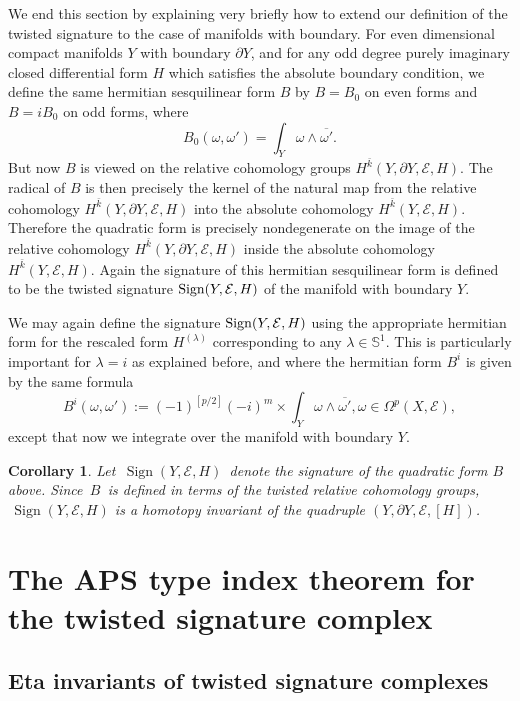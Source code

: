 \documentclass[12pt]{amsart}
\theoremstyle{plain}
\newtheorem{corollary}[theorem]{Corollary}
\theoremstyle{definition}
\theoremstyle{remark}
\begin{document}
We end this section by explaining very briefly how to extend our definition of the twisted signature to the case of manifolds with boundary. 
For even dimensional compact manifolds  $Y$ with boundary $\partial Y$, and for any odd degree purely imaginary closed differential form $H$ which satisfies the absolute boundary condition, 
we define the same hermitian sesquilinear form $B$ by $B= B_0$ on even forms and $B=iB_0$ on odd forms, where 
$$
B_0 (\omega, \omega' ) = \int_Y \omega \wedge {\overline{\omega'}}.
$$
But now $B$ is viewed on the relative cohomology 
groups $H^{\bar k}(Y, \partial Y, {\mathcal E},H)$. The radical of $B$ is then precisely the 
kernel of the natural map from the relative cohomology  $H^{\bar k}(Y, \partial Y, {\mathcal E},H)$ into 
the absolute cohomology $H^{\bar k}(Y,  {\mathcal E},H)$. Therefore the
quadratic form is precisely nondegenerate on the 
image of the relative cohomology  $H^{\bar k}(Y, \partial Y, {\mathcal E},H)$ inside the absolute cohomology 
$H^{\bar k}(Y,  {\mathcal E},H)$. Again the signature of this hermitian sesquilinear form 
is defined to be the twisted signature ${\rm Sign}(Y, {\mathcal E}, H)$ of the manifold with boundary $Y$.

We may again  define the signature ${\rm Sign}(Y, {\mathcal E}, H)$ using the appropriate hermitian form for the rescaled form $H^{(\lambda)}$ corresponding to 
any $\lambda\in {\mathbb{S}}^1$. This is particularly important for $\lambda = i$ as explained before, and where the hermitian form $B^i$ is given by the same formula
$$
B^i (\omega, \omega'):= (-1)^{[p/2]} (-i)^m \times  \int_Y \omega \wedge {\overline{\omega'}}, \omega \in \Omega^p (X, {\mathcal E}),
$$
except that now we integrate over the manifold with boundary $Y$. 

\begin{corollary}
Let $\, {\operatorname{Sign}}(Y, {\mathcal E}, H)\,$ denote the signature of the quadratic form $B$ above. 
Since $\, B\, $ is defined in terms of the twisted relative cohomology groups, 
$\, {\operatorname{Sign}}(Y, {\mathcal E}, H)$ is a homotopy invariant of the quadruple $(Y, \partial Y, {\mathcal E}, [H])$.
\end{corollary}

\section{The APS type index theorem for the twisted signature complex}

\subsection{Eta invariants of twisted signature complexes}
\label{sect:etarho}
\end{document}
